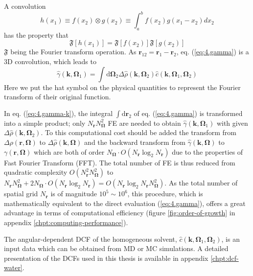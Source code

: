 A convolution
\begin{equation}
h(x_{1})\equiv f(x_{2})\otimes g(x_{2})\equiv\int_{a}^{b}f(x_{2})g(x_{1}-x_{2})dx_{2}\label{eq:convolution-1}
\end{equation}
has the property that
\begin{equation}
\mathfrak{F}[h(x_{1})]=\mathfrak{F}[f(x_{2})]\mathfrak{F}[g(x_{2})]\label{eq:convolution-2}
\end{equation}
$\mathfrak{F}$ being the Fourier transform operation. As $\mathbf{r}_{12}=\mathbf{r}_{1}-\mathbf{r}_{2}$,
eq. (\ref{eq:4.gamma}) is a 3D convolution, which leads to
\begin{equation}
\hat{\gamma}(\mathbf{k},\mathbf{\Omega}_{1})=\int\mathrm{d}\mathbf{\Omega}_{2}\Delta\hat{\rho}(\mathbf{k},\mathbf{\Omega}_{2})\hat{c}(\mathbf{k},\mathbf{\Omega}_{1},\mathbf{\Omega}_{2})\label{eq:4.gamma-k}
\end{equation}
Here we put the hat symbol on the physical quantities to represent
the Fourier transform of their original function.

In eq. (\ref{eq:4.gamma-k}), the integral $\int\mathrm{d}\mathbf{r}_{2}$
of eq. (\ref{eq:4.gamma}) is transformed into a simple product; only
$N_{\mathbf{r}}N_{\mathbf{\Omega}}^{2}$ \acs{FE} are needed to obtain
$\hat{\gamma}(\mathbf{k},\mathbf{\Omega}_{1})$ with given $\Delta\hat{\rho}(\mathbf{k},\mathbf{\Omega}_{2})$.
To this computational cost should be added the transform from $\Delta\rho(\mathbf{r},\mathbf{\Omega})$
to $\Delta\hat{\rho}(\mathbf{k},\mathbf{\Omega})$ and the backward
transform from $\hat{\gamma}(\mathbf{k},\mathbf{\Omega})$ to $\gamma(\mathbf{r},\mathbf{\Omega})$
which are both of order $N_{\mathbf{\Omega}}\cdot O(N_{\mathbf{r}}\log_{2}N_{\mathbf{r}})$
due to the properties of Fast Fourier Transform (\acs{FFT}). The
total number of \acs{FE} is thus reduced from quadratic complexity
$O(N_{\mathbf{r}}^{2}N_{\mathbf{\Omega}}^{2})$ to $N_{\mathbf{r}}N_{\mathbf{\Omega}}^{2}+2N_{\mathbf{\Omega}}\cdot O(N_{\mathbf{r}}\log_{2}N_{\mathbf{r}})=O(N_{\mathbf{r}}\log_{2}N_{\mathbf{r}}N_{\mathbf{\Omega}}^{2})$.
As the total number of spatial grid $N_{\mathbf{r}}$ is of magnitude
$10^{5}\sim10^{6}$, this procedure, which is mathematically equivalent
to the direct evaluation (\ref{eq:4.gamma}), offers a great advantage
in terms of computational efficiency (figure \ref{fig:order-of-growth}
in appendix \ref{chpt:computing-performance}).

The angular-dependent \acs{DCF} of the homogeneous solvent, $\hat{c}(\mathbf{k},\mathbf{\Omega}_{1},\mathbf{\Omega}_{2})$,
is an input data which can be obtained from \acs{MD} or \acs{MC}
simulations. A detailed presentation of the \acs{DCF}s used in this
thesis is available in appendix \ref{chpt:dcf-water}.

